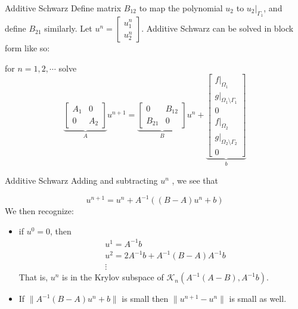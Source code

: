 \documentclass{beamer}
\begin{document}
\begin{frame}{Additive Schwarz}
		Define matrix $B_{12}$ to map the polynomial $u_2$ to $u_2 \rvert_{\Gamma_1}$, and define $B_{21}$ similarly. Let $u^n = \begin{bmatrix}
			u_1^n \\ u_2^n
		\end{bmatrix}$. Additive Schwarz can be solved in block form like so:
		\begin{center}
		for $n=1,2,\cdots$ solve
	\begin{equation*}
\underbrace{\begin{bmatrix}
A_1 & 0 \\
0 & A_2	
\end{bmatrix}}_{A} u^{n+1} = \underbrace{\begin{bmatrix}
0 & B_{12} \\
B_{21} & 0	
\end{bmatrix}}_{B} u^n + \underbrace{\begin{bmatrix}
	f\rvert_{\Omega_1} \\ g\rvert_{\Omega_1 \setminus \Gamma_1} \\ 0 \\ f\rvert_{\Omega_2} \\ g\rvert_{\Omega_2 \setminus \Gamma_2} \\ 0
\end{bmatrix}}_{b}
	\end{equation*}
	\end{center}

\end{frame}

\begin{frame}{Additive Schwarz}
		Adding and subtracting $u^n$	, we see that	
		\begin{center}
	\begin{equation*}
	u^{n+1} = u^n + A^{-1}((B-A)u^n+b)	
	\end{equation*}
	We then recognize:
	\begin{itemize}
		\item if $u^0=0$, then
\begin{equation*}
\begin{aligned} 
	& u^1 = A^{-1} b \\
	& u^2 = 2 A^{-1}b +A^{-1}(B-A)A^{-1}b \\
	& \vdots
\end{aligned}
\end{equation*}
That is, $u^n$ is in the Krylov subspace of $\mathcal{K}_n(A^{-1}(A-B), A^{-1}b)$.
		\item If $\| A^{-1}(B-A)u^n+b \|$ is small then $\| u^{n+1} - u^{n} \|$ is small as well.
	\end{itemize}
	\end{center}
\end{frame}
\end{document}
